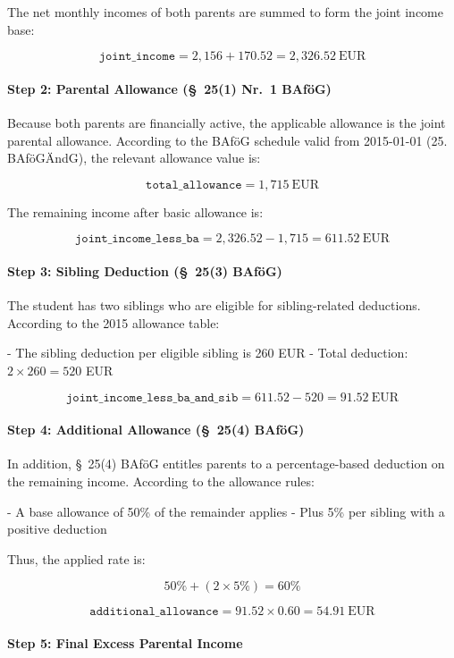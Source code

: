 The net monthly incomes of both parents are summed to form the joint income base:

\[
\texttt{joint\_income} = 2{,}156 + 170.52 = 2{,}326.52~\text{EUR}
\]

\paragraph{Step 2: Parental Allowance (§~25(1) Nr.~1 BAföG)}

Because both parents are financially active, the applicable allowance is the joint parental allowance. According to the BAföG schedule valid from 2015-01-01 (25. BAföGÄndG), the relevant allowance value is:

\[
\texttt{total\_allowance} = 1{,}715~\text{EUR}
\]

The remaining income after basic allowance is:

\[
\texttt{joint\_income\_less\_ba} = 2{,}326.52 - 1{,}715 = 611.52~\text{EUR}
\]

\paragraph{Step 3: Sibling Deduction (§~25(3) BAföG)}

The student has two siblings who are eligible for sibling-related deductions. According to the 2015 allowance table:

- The sibling deduction per eligible sibling is 260 EUR
- Total deduction: $2 \times 260 = 520$ EUR

\[
\texttt{joint\_income\_less\_ba\_and\_sib} = 611.52 - 520 = 91.52~\text{EUR}
\]

\paragraph{Step 4: Additional Allowance (§~25(4) BAföG)}

In addition, §~25(4) BAföG entitles parents to a percentage-based deduction on the remaining income. According to the allowance rules:

- A base allowance of 50\% of the remainder applies
- Plus 5\% per sibling with a positive deduction

Thus, the applied rate is:

\[
50\% + (2 \times 5\%) = 60\%
\]

\[
\texttt{additional\_allowance} = 91.52 \times 0.60 = 54.91~\text{EUR}
\]

\paragraph{Step 5: Final Excess Parental Income}

